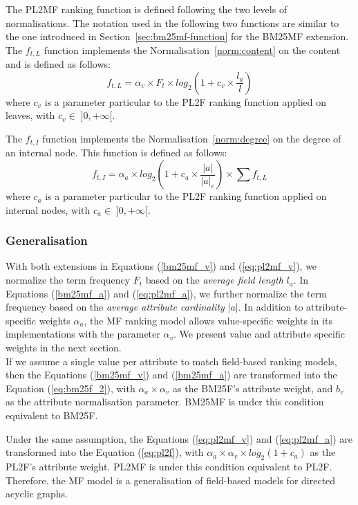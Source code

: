 The PL2MF ranking function is defined following the two levels of normalisations. The notation used in the following two functions are similar to the one introduced in Section~\ref{sec:bm25mf-function} for the BM25MF extension.
The $f_{t,L}$ function implements the Normalisation~\ref{norm:content} on the content and is defined as follows:
\begin{equation}
\label{eq:pl2mf_v}
f_{t,L} = \alpha_v\times F_t \times log_2\left(1+c_v\times\frac{l_a}{l}\right)
\end{equation}
where $c_v$ is a parameter particular to the PL2F ranking function applied on leaves, with $c_v \in\; ]0,+\infty[$.

The $f_{t,I}$ function implements the Normalisation~\ref{norm:degree} on the degree of an internal node. This function is defined as follows:
\begin{equation}
\label{eq:pl2mf_a}
f_{t,I} = \alpha_a \times log_2\left(1+c_a\times\frac{\left|{a}\right|}{\left|{a}\right|_e}\right) \times \sum{f_{t,L}}
\end{equation}
where $c_a$ is a parameter particular to the PL2F ranking function applied on internal nodes, with $c_a \in\; ]0,+\infty[$.

\subsubsection{Generalisation}

With both extensions in Equations (\ref{bm25mf_v}) and (\ref{eq:pl2mf_v}), we normalize the term frequency $F_t$ based on the \emph{average field length} $l_a$. In Equations (\ref{bm25mf_a}) and (\ref{eq:pl2mf_a}), we further normalize the term frequency based on the \emph{average attribute cardinality} $\left|{a}\right|$.
In addition to attribute-specific weights $\alpha_a$, the MF ranking model allows value-specific weights in its implementations with the parameter $\alpha_v$. We present value and attribute specific weights in the next section.\\

If we assume a single value per attribute to match field-based ranking models, then the Equations (\ref{bm25mf_v}) and (\ref{bm25mf_a}) are transformed into the Equation (\ref{eq:bm25f_2}), with $\alpha_a\times\alpha_v$ as the BM25F's attribute weight, and $b_v$ as the attribute normalisation parameter. BM25MF is under this condition equivalent to BM25F.

Under the same assumption, the Equations (\ref{eq:pl2mf_v}) and (\ref{eq:pl2mf_a}) are transformed into the Equation (\ref{eq:pl2f}), with $\alpha_a\times\alpha_v\times log_2(1+c_a)$ as the PL2F's attribute weight. PL2MF is under this condition equivalent to PL2F.\\

Therefore, the MF model is a generalisation of field-based models for directed acyclic graphs.
